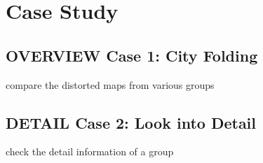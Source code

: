 \section{Case Study}

\subsection{OVERVIEW Case 1: City Folding}

compare the distorted maps from various groups

\subsection{DETAIL Case 2: Look into Detail}

check the detail information of a group